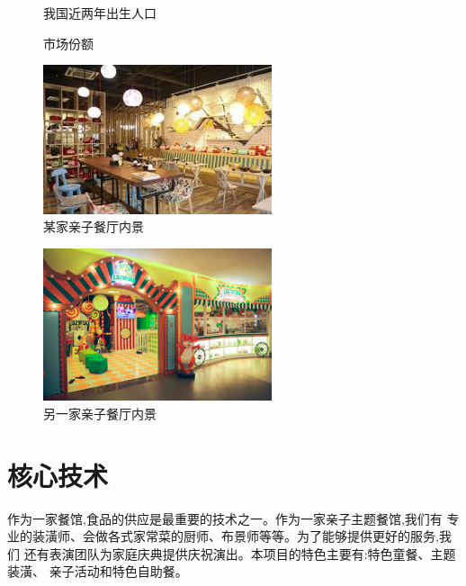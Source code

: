 \begin{figure}[ htbp ]
        \centering
        \caption{我国近两年出生人口}
        
\end{figure}
\begin{figure}[ htbp ]
        \centering
        \caption{市场份额}
        \label{fig:market-share}
        
\end{figure}
\begin{figure}[ htbp ]
        \centering
        \caption{某家亲子餐厅内景}
        \includegraphics[width=0.6\textwidth]{../images/interior/内景1}
\end{figure}
\begin{figure}[ htbp ]
        \centering
        \caption{另一家亲子餐厅内景}
        \includegraphics[width=0.6\textwidth]{../images/interior/内景2}
\end{figure}

\section{核心技术}
作为一家餐馆,食品的供应是最重要的技术之一。作为一家亲子主题餐馆,我们有
专业的装潢师、会做各式家常菜的厨师、布景师等等。为了能够提供更好的服务,我们
还有表演团队为家庭庆典提供庆祝演出。本项目的特色主要有:特色童餐、主题装潢、
亲子活动和特色自助餐。

